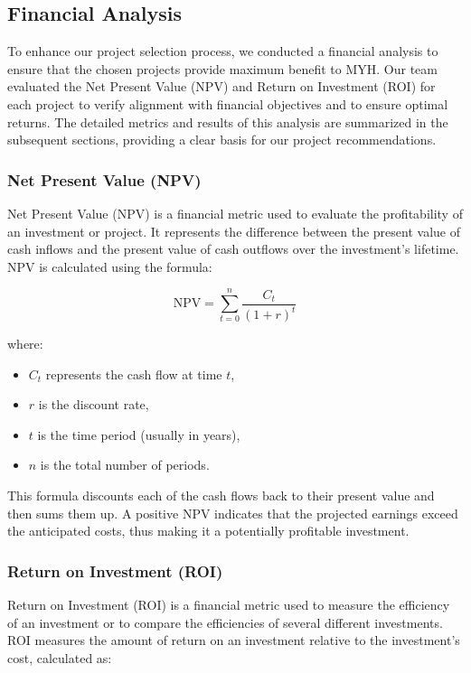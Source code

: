 \subsection{Financial Analysis} \label{sec:fa}

To enhance our project selection process, we conducted a financial analysis to ensure that the chosen projects provide maximum benefit to MYH. Our team evaluated the Net Present Value (NPV) and Return on Investment (ROI) for each project to verify alignment with financial objectives and to ensure optimal returns. The detailed metrics and results of this analysis are summarized in the subsequent sections, providing a clear basis for our project recommendations.

\subsubsection*{Net Present Value (NPV)}
Net Present Value (NPV) is a financial metric used to evaluate the profitability of an investment or project. It represents the difference between the present value of cash inflows and the present value of cash outflows over the investment's lifetime. NPV is calculated using the formula:

\[
\text{NPV} = \sum_{t=0}^{n} \frac{C_t}{(1 + r)^t}
\]

where:
\begin{itemize}
    \item \( C_t \) represents the cash flow at time \( t \),
    \item \( r \) is the discount rate,
    \item \( t \) is the time period (usually in years),
    \item \( n \) is the total number of periods.
\end{itemize}

This formula discounts each of the cash flows back to their present value and then sums them up. A positive NPV indicates that the projected earnings exceed the anticipated costs, thus making it a potentially profitable investment.

\subsubsection*{Return on Investment (ROI)}
Return on Investment (ROI) is a financial metric used to measure the efficiency of an investment or to compare the efficiencies of several different investments. ROI measures the amount of return on an investment relative to the investment's cost, calculated as:

